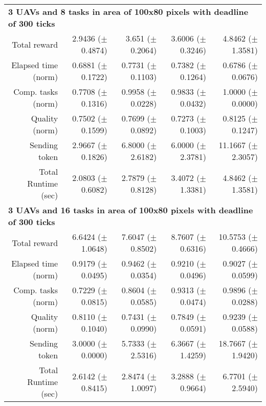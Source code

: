 \begin{table}
\begin{tabular}{rrrrr}
		\multicolumn{5}{l}{\textbf{3 UAVs and 8 tasks in area of 100x80 pixels with deadline of 300 ticks}} \\
		Total reward           &    2.9436 ($\pm$0.4874)   &  3.651   ($\pm$0.2064)   &  3.6006  ($\pm$0.3246) &   4.8462  ($\pm$1.3581) \\
		Elapsed time (norm)    &   0.6881  ($\pm$0.1722)   &  0.7731  ($\pm$0.1103)   &  0.7382  ($\pm$0.1264) &   0.6786  ($\pm$0.0676) \\ 
		Comp. tasks (norm)     &   0.7708  ($\pm$0.1316)   &  0.9958  ($\pm$0.0228)   &  0.9833  ($\pm$0.0432) &   1.0000  ($\pm$0.0000) \\ 
		Quality (norm)         &   0.7502  ($\pm$0.1599)   &  0.7699  ($\pm$0.0892)   &  0.7273  ($\pm$0.1003) &   0.8125  ($\pm$0.1247) \\ 
		Sending token          &   2.9667  ($\pm$0.1826)   &  6.8000  ($\pm$2.6182)   &  6.0000  ($\pm$2.3781) &   11.1667 ($\pm$2.3057) \\ 
		Total Runtime (sec)    &  2.0803   ($\pm$0.6082)   &  2.7879  ($\pm$0.8128)   &  3.4072  ($\pm$1.3381) &   4.8462  ($\pm$1.3581) \\ [1ex]
		
		\multicolumn{5}{l}{\textbf{3 UAVs and 16 tasks in area of 100x80 pixels with deadline of 300 ticks}} \\
		Total reward           &   6.6424  ($\pm$1.0648)    &  7.6047  ($\pm$0.8502)  &  8.7607  ($\pm$0.6316) &   10.5753 ($\pm$0.4666) \\
		Elapsed time (norm)    &   0.9179  ($\pm$0.0495)    &  0.9462  ($\pm$0.0354)  &  0.9210  ($\pm$0.0496) &   0.9027  ($\pm$0.0599) \\ 
		Comp. tasks (norm)     &   0.7229  ($\pm$0.0815)    &  0.8604  ($\pm$0.0585)  &  0.9313  ($\pm$0.0474) &   0.9896  ($\pm$0.0288) \\ 
		Quality (norm)         &   0.8110  ($\pm$0.1040)    &  0.7431  ($\pm$0.0990)  &  0.7849  ($\pm$0.0591) &   0.9239  ($\pm$0.0588) \\ 
		Sending token          &   3.0000  ($\pm$0.0000)    &  5.7333  ($\pm$2.5316)  &  6.3667  ($\pm$1.4259) &   18.7667 ($\pm$1.9420) \\ 
		Total Runtime (sec)    &   2.6142  ($\pm$0.8415)    &  2.8474  ($\pm$1.0097)  &  3.2888  ($\pm$0.9664) &   6.7701  ($\pm$2.5940) \\ [1ex]
                                                                                                                              

\end{tabular}
\end{table}
